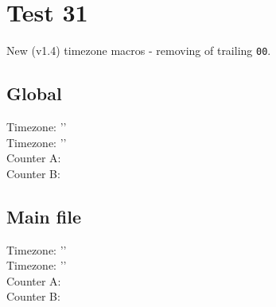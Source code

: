 \documentclass[12pt]{report}
\newcounter{mytimeza}
\newcounter{mytimezb}
\begin{document}
\chapter{Test 31}
New (v1.4) timezone macros - removing of trailing \verb|00|.

\section{Global}
Timezone:   '\svntimezone'\\
Timezone:   ''\\
\setcounter{mytimeza}{\svntimezone}
\setcounter{mytimezb}{\svntimezone00}
Counter A: \themytimeza\\
Counter B: \themytimezb\\
%
%
\ifthenelse{\themytimeza = \themytimezb}{}{\error}%

\section{Main file}
Timezone:   '\svnfiletimezone'\\
Timezone:   ''\\
\setcounter{mytimeza}{\svnfiletimezone}
\setcounter{mytimezb}{\svnfiletimezone00}
Counter A: \themytimeza\\
Counter B: \themytimezb\\
%
%
\ifthenelse{\themytimeza = \themytimezb}{}{\error}%



\end{document}
